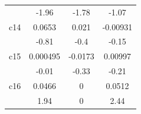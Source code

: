 \begin{table}[H]
\begin{tabular}{cccc}
                                        & -1.96                                 & -1.78                               & -1.07                                \\
        \multicolumn{1}{p{6.93em}}{c14} & 0.0653                                & 0.021                               & -0.00931                             \\
                                        & -0.81                                 & -0.4                                & -0.15                                \\
        \multicolumn{1}{p{6.93em}}{c15} & 0.000495                              & -0.0173                             & 0.00997                              \\
                                        & -0.01                                 & -0.33                               & -0.21                                \\
        \multicolumn{1}{p{6.93em}}{c16} & 0.0466                                & 0                                   & 0.0512                               \\
                                        & 1.94                                  & 0                                   & 2.44                                 \\
        \bottomrule
    \end{tabular}%
    \label{Table 2.7}%
\end{table}%

